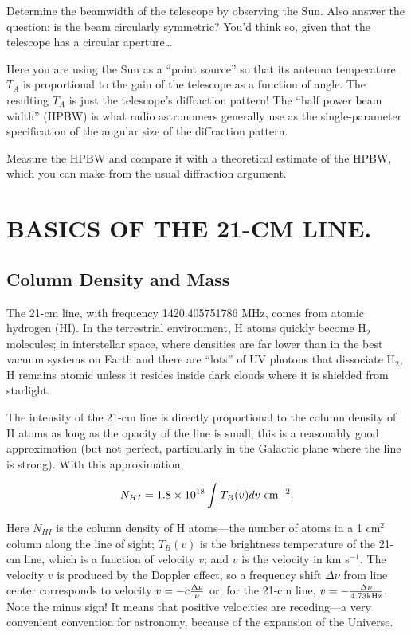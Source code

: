 \documentclass[preprint]{aastex}
\begin{document}
	Determine the beamwidth of the telescope by observing the Sun.  Also
answer the question: is the beam circularly symmetric? You'd think so,
given that the telescope has a circular aperture\dots

	Here you are using the Sun as a ``point source'' so that its
antenna temperature $T_A$ is proportional to the gain of the telescope as a
function of angle. The resulting $T_A$ is just the telescope's diffraction
pattern! The ``half power beam width'' (HPBW) is what radio astronomers
generally use as the single-parameter specification of the angular size of
the diffraction pattern. 

          Measure the HPBW and compare it with a theoretical estimate of
the HPBW, which you can make from the usual diffraction argument. 


\section{BASICS OF THE 21-CM LINE.} \label{basics}

\subsection{Column Density and Mass} \label{coldensity}

	The 21-cm line, with frequency 1420.405751786 MHz, comes from
atomic hydrogen (HI).  In the terrestrial environment, H atoms quickly
become H$_2$ molecules; in interstellar space, where densities are far
lower than in the best vacuum systems on Earth and there are ``lots'' of
UV photons that dissociate H$_2$, H remains atomic unless it resides
inside dark clouds where it is shielded from starlight.

	The intensity of the 21-cm line is directly proportional to the
column density of H atoms as long as the opacity of the line is small;
this is a reasonably good approximation (but not perfect, particularly
in the Galactic plane where the line is strong). With this
approximation, 

\begin{equation} \label{nh1}
N_{HI} = 1.8 \times 10^{18} \int T_{B}(v) dv \ {\rm cm^{-2}}. 
\end{equation}

\noindent Here $N_{HI}$ is the column density of H atoms---the number of
atoms in a 1 cm$^2$ column along the line of sight; $T_{B}(v)$ is the
brightness temperature of the 21-cm line, which is a function of 
velocity $v$; and $v$ is the velocity in km s$^{-1}$. The velocity $v$
is produced by the Doppler effect, so a frequency shift $\Delta \nu$
from line center corresponds to velocity $v = - c {\Delta \nu \over
\nu}$ or, for the 21-cm line, $v = -{\Delta \nu \over 4.73 {\rm kHz}}$.
Note the minus sign! It means that positive velocities are receding---a
very convenient convention for astronomy, because of the expansion of
the Universe. 
\end{document}
